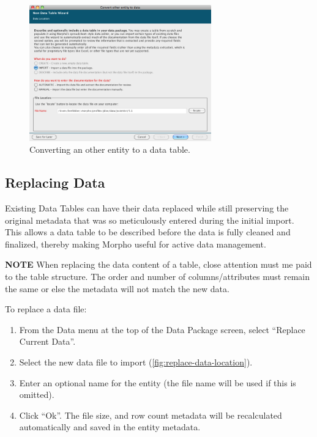 \begin{figure}
  \centering
    \includegraphics[width=0.7\textwidth]{images/convert-other-entity-location.png}
  \caption{Converting an other entity to a data table.}
  \label{fig:convert-other-entity-location}
\end{figure}

\subsection[Replacing Data]{Replacing Data}
\label{sec:replacing-data}

Existing Data Tables can have their data replaced while still 
preserving the original metadata that was so meticulously entered during the initial import.
This allows a data table to be described before the data is fully cleaned and finalized, 
thereby making Morpho useful for active data management.

\begin{shaded}
  \textbf{NOTE} When replacing the data content of a table, close attention must me paid to the table structure. 
  The order and number of columns/attributes must remain the same or else the metadata will not match the new data.
\end{shaded}

To replace a data file:
\begin{enumerate}
  \item From the Data menu at the top of the Data Package screen, select
    ``Replace Current Data''.
  \item Select the new data file to import (\autoref{fig:replace-data-location}). 
  \item Enter an optional name for the entity (the file name will be used if this is omitted).
  \item Click ``Ok''. The file size, and row count metadata will be recalculated automatically 
  and saved in the entity metadata.
\end{enumerate}

